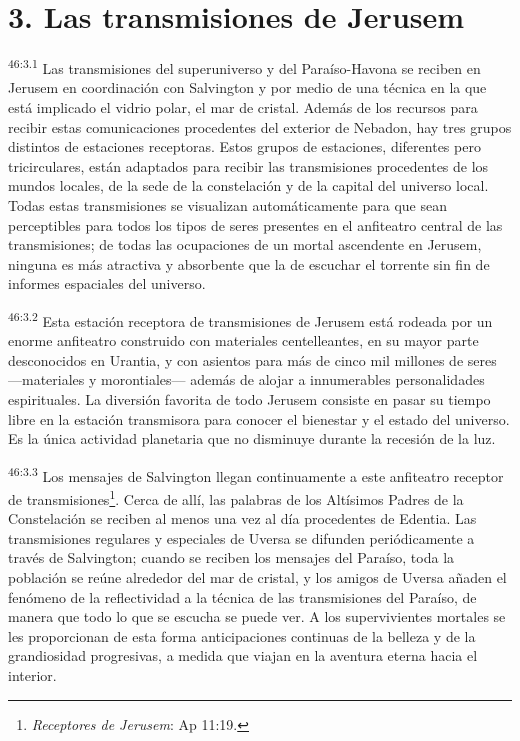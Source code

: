 \section*{3. Las transmisiones de Jerusem}
\par
\textsuperscript{46:3.1} Las transmisiones del superuniverso y del Paraíso-Havona se reciben en Jerusem en coordinación con Salvington y por medio de una técnica en la que está implicado el vidrio polar, el mar de cristal. Además de los recursos para recibir estas comunicaciones procedentes del exterior de Nebadon, hay tres grupos distintos de estaciones receptoras. Estos grupos de estaciones, diferentes pero tricirculares, están adaptados para recibir las transmisiones procedentes de los mundos locales, de la sede de la constelación y de la capital del universo local. Todas estas transmisiones se visualizan automáticamente para que sean perceptibles para todos los tipos de seres presentes en el anfiteatro central de las transmisiones; de todas las ocupaciones de un mortal ascendente en Jerusem, ninguna es más atractiva y absorbente que la de escuchar el torrente sin fin de informes espaciales del universo.

\par
\textsuperscript{46:3.2} Esta estación receptora de transmisiones de Jerusem está rodeada por un enorme anfiteatro construido con materiales centelleantes, en su mayor parte desconocidos en Urantia, y con asientos para más de cinco mil millones de seres ---materiales y morontiales--- además de alojar a innumerables personalidades espirituales. La diversión favorita de todo Jerusem consiste en pasar su tiempo libre en la estación transmisora para conocer el bienestar y el estado del universo. Es la única actividad planetaria que no disminuye durante la recesión de la luz.

\par
\textsuperscript{46:3.3} Los mensajes de Salvington llegan continuamente a este anfiteatro receptor de transmisiones\footnote{\textit{Receptores de Jerusem}: Ap 11:19.}. Cerca de allí, las palabras de los Altísimos Padres de la Constelación se reciben al menos una vez al día procedentes de Edentia. Las transmisiones regulares y especiales de Uversa se difunden periódicamente a través de Salvington; cuando se reciben los mensajes del Paraíso, toda la población se reúne alrededor del mar de cristal, y los amigos de Uversa añaden el fenómeno de la reflectividad a la técnica de las transmisiones del Paraíso, de manera que todo lo que se escucha se puede ver. A los supervivientes mortales se les proporcionan de esta forma anticipaciones continuas de la belleza y de la grandiosidad progresivas, a medida que viajan en la aventura eterna hacia el interior.

